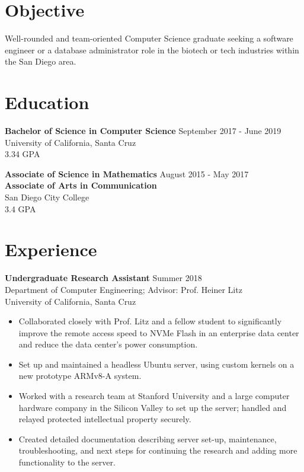 \documentclass[margin]{res}
\begin{document}
 
 
 
\address{{\bf Address} \\ 707 Pelton Avenue \\ Santa Cruz, CA 95060}
\address{{\bf Mobile:} (858) 123-4567 \\ {\bf Email:} johnsmith@ucsc.edu \\ {\bf Github:} johnsmith}

 
\begin{resume}
 
\section{Objective} 
Well-rounded and team-oriented Computer Science graduate seeking a software engineer or a database administrator role in the biotech or tech industries within the San Diego area.

\section{Education} 
{\bf Bachelor of Science in Computer Science} \hfill September 2017 - June 2019 \\
University of California, Santa Cruz \\
3.34 GPA

{\bf Associate of Science in Mathematics} \hfill August 2015 - May 2017 \\
{\bf Associate of Arts in Communication} \\
San Diego City College \\
3.4 GPA

\section{Experience}
 {\bf Undergraduate Research Assistant} \hfill Summer 2018 \\
 Department of Computer Engineering; Advisor: Prof. Heiner Litz \\
 University of California, Santa Cruz \\
 \begin{itemize} \itemsep -1pt 
 \item Collaborated closely with Prof. Litz and a fellow student to significantly improve the remote access speed to NVMe Flash in an enterprise data center and reduce the data center's power consumption. 
 \item Set up and maintained a headless Ubuntu server, using custom kernels on a new prototype ARMv8-A system.
 \item Worked with a research team at Stanford University and a large computer hardware company in the Silicon Valley to set up the server; handled and relayed protected intellectual property securely.
 \item Created detailed documentation describing server set-up, maintenance, troubleshooting, and next steps for continuing the research and adding more functionality to the server.
 \end{itemize}
 

\end{resume}
\end{document}
